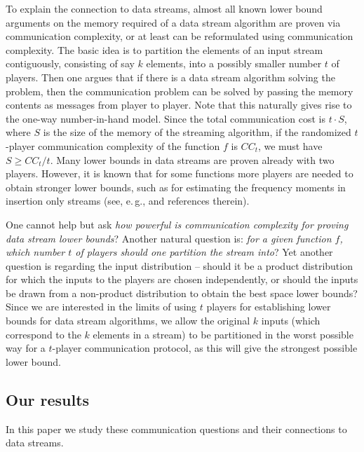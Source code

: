 \documentclass[11pt]{article}
\numberwithin{equation}{section}
\theoremstyle{definition}
\theoremstyle{plain}
\newcommand{\eg}{e.\,g.}
\begin{document}
To explain the connection to data streams, almost all known lower bound arguments on the memory required of a data stream algorithm are proven via communication complexity, or at least can be reformulated using communication complexity. 
The basic idea is to partition the elements of an input stream contiguously, consisting of say $k$ elements, into a possibly smaller number $t$ of players. 
Then one argues that if there is a data stream algorithm  solving the problem, then the communication problem can be solved by passing the memory contents as messages from player to player. 
Note that this naturally gives rise to the one-way number-in-hand model. 
Since the total communication cost is $t \cdot S$, where $S$ is the size of the memory of the streaming algorithm, if the randomized $t$-player communication complexity of the function $f$ is $CC_t$, we must have $S \geq CC_t/t$. 
Many lower bounds in data streams are proven already with two players.
However, it is known that for some functions more  players are needed to obtain stronger lower bounds, such as for estimating the frequency moments in insertion only streams (see, \eg,
 \cite{BarYossef:2004eya,wz12} and references therein). 

One cannot help but ask \emph{how powerful is communication complexity for proving data stream lower bounds}? Another natural question is: \emph{for a given function $f$, which number $t$ of players should one partition the stream into}? 
Yet another question is regarding the input distribution -- should it be a product distribution for which the inputs to the players are chosen independently, 
or should the inputs be drawn from a non-product distribution to obtain the best space lower bounds? 
Since we are interested in the limits of using $t$ players for establishing lower bounds for data stream algorithms, we allow the original $k$ inputs (which correspond to the $k$ elements in a stream) to be partitioned in the worst possible way for a $t$-player communication protocol, as this will give the strongest possible lower bound.

\subsection{Our results}
In this paper we study these communication questions and their connections to data streams.
\end{document}

